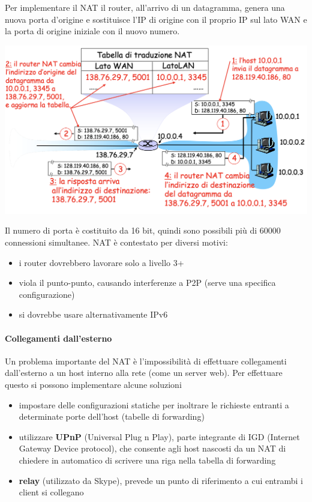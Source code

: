 \documentclass{report}
\begin{document}
Per implementare il NAT il router, all'arrivo di un datagramma, genera
una nuova porta d'origine e sostituisce l'IP di origine con il proprio
IP sul lato WAN e la porta di origine iniziale con il nuovo numero.

\begin{center}
		\includegraphics[width=0.7\linewidth]{nat}
	\end{center}

Il numero di porta è costituito da 16 bit, quindi sono possibili più di
60000 connessioni simultanee. NAT è contestato per diversi motivi:

\begin{itemize}
\item
  i router dovrebbero lavorare solo a livello 3+
\item
  viola il punto-punto, causando interferenze a P2P (serve una specifica
  configurazione)
\item
  si dovrebbe usare alternativamente IPv6
\end{itemize}

\hypertarget{header-n141}{%
\paragraph{Collegamenti dall'esterno}\label{header-n141}}

Un problema importante del NAT è l'impossibilità di effettuare
collegamenti dall'esterno a un host interno alla rete (come un server
web). Per effettuare questo si possono implementare alcune soluzioni

\begin{itemize}
\item
  impostare delle configurazioni statiche per inoltrare le richieste
  entranti a determinate porte dell'host (tabelle di forwarding)
\item
  utilizzare \textbf{UPnP} (Universal Plug n Play), parte integrante di
  IGD (Internet Gateway Device protocol), che consente agli host
  nascosti da un NAT di chiedere in automatico di scrivere una riga
  nella tabella di forwarding
\item
  \textbf{relay} (utilizzato da Skype), prevede un punto di riferimento
  a cui entrambi i client si collegano
\end{itemize}
\end{document}
